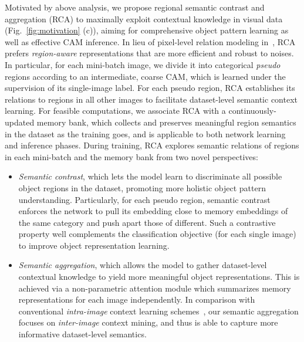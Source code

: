 \documentclass[10pt,twocolumn,letterpaper]{article}
\begin{document}
Motivated by above analysis, we propose regional semantic contrast and aggregation (RCA) to maximally exploit  contextual knowledge in visual data (Fig.~\ref{fig:motivation} (c)), aiming for comprehensive object pattern learning as well as effective CAM inference. In lieu of pixel-level relation modeling in~\cite{fan2020cian,sun2020mining,zhou2021group},  RCA prefers \emph{region-aware} representations that are more efficient and robust to noises. In particular, for each mini-batch image, we divide it into categorical  \emph{pseudo} regions according to an intermediate, coarse CAM, which is learned under the supervision of its single-image label. For each pseudo region, RCA establishes  its relations  to regions in all other images to facilitate dataset-level semantic context learning. For feasible computations, we associate RCA with a continuously-updated memory bank, which collects and preserves meaningful region semantics in the dataset as the training goes, and is applicable to both network learning and inference phases. During training, RCA explores semantic relations of regions in each mini-batch and the memory bank from two novel perspectives:
\begin{itemize}[leftmargin=*]
	\setlength{\itemsep}{0pt}
	\setlength{\parsep}{-2pt}
	\setlength{\parskip}{-0pt}
	\setlength{\leftmargin}{-8pt}
\vspace{-4pt}\item \textit{Semantic contrast}, which lets the model learn to discriminate all possible object regions in the dataset, promoting more holistic object pattern understanding. Particularly, for each pseudo region, {semantic contrast} enforces the network to pull its embedding close to memory embeddings of the same category and push apart those of different. Such a contrastive property well complements the classification objective (for each single image) to improve object representation learning.
	
	\item  \textit{Semantic aggregation}, which allows the model to gather dataset-level  contextual knowledge to yield more meaningful object representations. This is achieved via a non-parametric attention module which  summarizes memory representations  for each  image independently. In comparison with conventional \textit{intra-image} context learning schemes~\cite{chen20182,yuan2020object}, our semantic aggregation focuses on  \textit{inter-image}  context mining, and thus is able to capture more informative dataset-level semantics.
	

	
	\vspace{-4pt}
\end{itemize}
\end{document}
